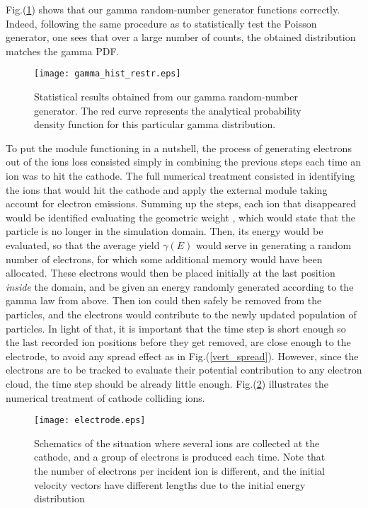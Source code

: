 \noindent Fig.(\ref{gamma_hist}) shows that our gamma random-number generator functions correctly. Indeed, following the same procedure as to statistically test the Poisson generator, one sees that over a large number of counts, the obtained distribution matches the gamma PDF. 

\begin{figure}[h!]
\centering
	\texttt{[image: gamma\_hist\_restr.eps]}
	\caption{\label{gamma_hist} Statistical results obtained from our gamma random-number generator. The red curve represents the analytical probability density function for this particular gamma distribution. }
\end{figure}  



To put the module functioning in a nutshell, the process of generating electrons out of the ions loss consisted simply in combining the previous steps each time an ion was to hit the cathode. The full numerical treatment consisted in identifying the ions that would hit the cathode and apply the external module taking account for electron emissions. Summing up the steps, each ion that disappeared would be identified evaluating the geometric weight \cite{fennecs}, which would state that the particle is no longer in the simulation domain. Then, its energy would be evaluated, so that the average yield $\gamma(E)$ would serve in generating a random number of electrons, for which some additional memory would have been allocated. These electrons would then be placed initially at the last position \emph{inside} the domain, and be given an energy randomly generated according to the gamma law from above. Then ion could then safely be removed from the particles, and the electrons would contribute to the newly updated population of particles. In light of that, it is important that the time step is short enough so the last recorded ion positions before they get removed, are close enough to the electrode, to avoid any spread effect as in Fig.(\ref{vert_spread}). However, since the electrons are to be tracked to evaluate their potential contribution to any electron cloud, the time step should be already little enough. Fig.(\ref{scheme}) illustrates the numerical treatment of cathode colliding ions. 

\begin{figure}[h!]
\centering
	\texttt{[image: electrode.eps]}
	\caption{\label{scheme} Schematics of the situation where several ions are collected at the cathode, and a group of electrons is produced each time. Note that the number of electrons per incident ion is different, and the initial velocity vectors have different lengths due to the initial energy distribution}
\end{figure}  




